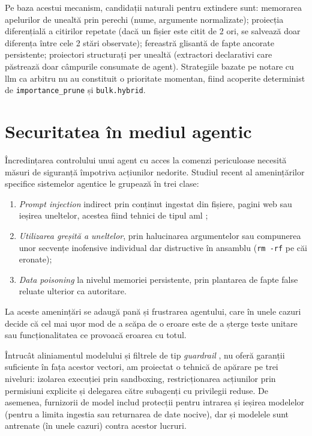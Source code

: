 \documentclass[12pt, a4paper, oneside, romanian]{teza-upb}
\begin{document}
    Pe baza acestui mecanism, candidații naturali pentru extindere sunt: memorarea apelurilor de unealtă prin perechi (nume, argumente normalizate); proiecția diferențială a citirilor repetate (dacă un fișier este citit de 2 ori, se salvează doar diferența între cele 2 stări observate); fereastră glisantă de fapte ancorate persistente; proiectori structurați per unealtă (extractori declarativi care păstrează doar câmpurile consumate de agent). Strategiile bazate pe notare cu \ac{llm} ca arbitru nu au constituit o prioritate momentan, fiind acoperite determinist de \texttt{importance\_prune} și \texttt{bulk.hybrid}.

  \section{Securitatea în mediul agentic}

    Încredințarea controlului unui agent cu acces la comenzi periculoase necesită măsuri de siguranță împotriva acțiunilor nedorite. Studiul recent al amenințărilor specifice sistemelor agentice \cite{shahriarSurveyAgenticSecurity2025} le grupează în trei clase:

    \begin{enumerate}\itemsep=0pt\parsep=0pt 
      \item \emph{Prompt injection} indirect prin conținut ingestat din fișiere, pagini web sau ieșirea uneltelor, acestea fiind tehnici de tipul \ac{aml} \cite{hackettBypassingLLMGuardrails2025};
      \item \emph{Utilizarea greșită a uneltelor}, prin halucinarea argumentelor sau compunerea unor secvențe inofensive individual dar distructive în ansamblu (\texttt{rm -rf} pe căi eronate);
      \item \emph{Data poisoning} la nivelul memoriei persistente, prin plantarea de fapte false reluate ulterior ca autoritare.
    \end{enumerate}

    La aceste amenințări se adaugă pană și frustrarea agentului, care în unele cazuri decide că cel mai ușor mod de a scăpa de o eroare este de a șterge teste unitare sau funcționalitatea ce provoacă eroarea cu totul.

    Întrucât aliniamentul modelului \cite{baiConstitutionalAIHarmlessness2022} și filtrele de tip \textit{guardrail} \cite{rebedeaNeMoGuardrailsToolkit2023}, \cite{liuGuardReasonerReasoningbasedLLM2025} nu oferă garanții suficiente în fața acestor vectori, am proiectat o tehnică de apărare pe trei niveluri: izolarea execuției prin sandboxing, restricționarea acțiunilor prin permisiuni explicite și delegarea către subagenți cu privilegii reduse. De asemenea, furnizorii de model includ protecții pentru intrarea și ieșirea modelelor (pentru a limita ingestia sau returnarea de date nocive), dar și modelele sunt antrenate (în unele cazuri) contra acestor lucruri.
\end{document}
